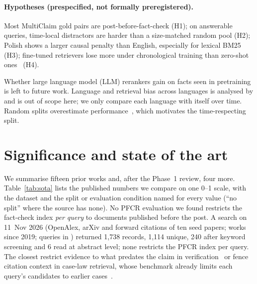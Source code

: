 \documentclass[11pt]{article}
\begin{document}
\paragraph{Hypotheses (prespecified, not formally preregistered).}
Most MultiClaim gold pairs are post-before-fact-check (H1); on answerable queries, time-local distractors are harder than a size-matched random pool (H2); Polish shows a larger causal penalty than English, especially for lexical BM25 (H3); fine-tuned retrievers lose more under chronological training than zero-shot ones~\cite{shaar2022role} (H4).

Whether large language model (LLM) rerankers gain on facts seen in pretraining is left to future work.
Language and retrieval bias across languages is analysed by  and is out of scope here; we only compare each language with itself over time.
Random splits overestimate performance~\cite{sogaard2021random}, which motivates the time-respecting split.

\section{Significance and state of the art}
\label{sec:sota}
We summarise fifteen prior works and, after the Phase~1 review, four more.
Table~\ref{tab:sota} lists the published numbers we compare on one 0--1 scale, with the dataset and the split or evaluation condition named for every value (``no split'' where the source has none).
No PFCR evaluation we found restricts the fact-check index \emph{per query} to documents published before the post.
A search on 11~Nov 2026 (OpenAlex, arXiv and forward citations of ten seed papers; works since 2019; queries in ) returned 1,738 records, 1,114 unique, 240 after keyword screening and 6 read at abstract level; none restricts the PFCR index per query. The closest restrict evidence to what predates the claim in verification~\cite{wu2026nohindsight} or fence citation context in case-law retrieval, whose benchmark already limits each query's candidates to earlier cases~\cite{liu2026fenced}.
\end{document}
